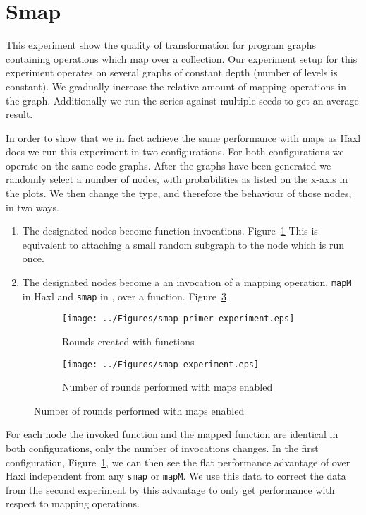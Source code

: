 \section{Smap}

This experiment show the quality of transformation for program graphs containing operations which map over a collection.
Our experiment setup for this experiment operates on several graphs of constant depth (number of levels is constant).
We gradually increase the relative amount of mapping operations in the graph.
Additionally we run the series against multiple seeds to get an average result.

In order to show that we in fact achieve the same performance with maps as Haxl does we run this experiment in two configurations.
For both configurations we operate on the same code graphs.
After the graphs have been generated we randomly select a number of nodes, with probabilities as listed on the x-axis in the plots.
We then change the type, and therefore the behaviour of those nodes, in two ways.

\begin{enumerate}
  \item The designated nodes become function invocations. Figure~\ref{fig:smap-experiment-primer}
        This is equivalent to attaching a small random subgraph to the node which is run once.
  \item The designated nodes become a an invocation of a mapping operation, \texttt{mapM} in Haxl and \texttt{smap} in \yauhau{}, over a function. Figure~\ref{fig:smap-experiment}
\end{enumerate}

\begin{figure}[h]
  \begin{subfigure}{\textwidth}
      \texttt{[image: ../Figures/smap-primer-experiment.eps]}
      \caption{Rounds created with functions}
      \label{fig:smap-experiment-primer}
  \end{subfigure}

  \begin{subfigure}{\textwidth}
      \texttt{[image: ../Figures/smap-experiment.eps]}
      \caption{Number of rounds performed with maps enabled}
      \label{fig:smap-experiment}
  \end{subfigure}
\end{figure}

For each node the invoked function and the mapped function are identical in both configurations, only the number of invocations changes.
In the first configuration, Figure~\ref{fig:smap-experiment-primer}, we can then see the flat performance advantage of \yauhau{} over Haxl independent from any \texttt{smap} or \texttt{mapM}.
We use this data to correct the data from the second experiment by this advantage to only get performance with respect to mapping operations.

